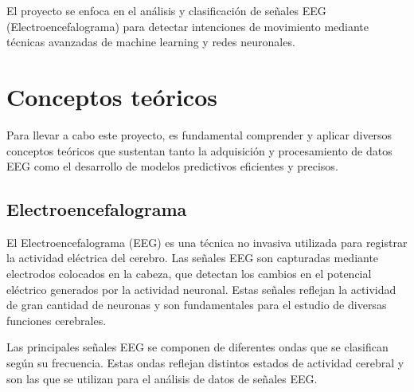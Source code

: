 
El proyecto se enfoca en el análisis y clasificación de señales EEG (Electroencefalograma) para detectar intenciones de movimiento mediante técnicas avanzadas de machine learning y redes neuronales.


\section{Conceptos teóricos}


Para llevar a cabo este proyecto, es fundamental comprender y aplicar diversos conceptos teóricos que sustentan tanto la adquisición y procesamiento de datos EEG como el desarrollo de modelos predictivos eficientes y precisos.

\subsection{Electroencefalograma}

El Electroencefalograma (EEG) es una técnica no invasiva utilizada para registrar la actividad eléctrica del cerebro. Las señales EEG son capturadas mediante electrodos colocados en la cabeza, que detectan los cambios en el potencial eléctrico generados por la actividad neuronal. Estas señales reflejan la actividad de gran cantidad de neuronas y son fundamentales para el estudio de diversas funciones cerebrales.



Las principales señales EEG se componen de diferentes ondas que se clasifican según su frecuencia. Estas ondas reflejan distintos estados de actividad cerebral y son las que se utilizan para el análisis de datos de señales EEG.


